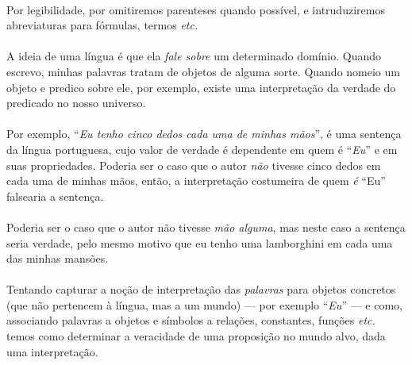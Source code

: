     \paragraph{}
        Por legibilidade, por omitiremos parenteses quando possível, e 
        intruduziremos abreviaturas para fórmulas, termos \emph{etc.}
    \paragraph{}
        A ideia de uma língua é que ela \emph{fale sobre} um determinado
        domínio. Quando escrevo, minhas palavras tratam de objetos de alguma 
        sorte. Quando nomeio um objeto e predico sobre ele, por exemplo, 
        existe uma interpretação da verdade do predicado no nosso universo.
    \paragraph{}
        Por exemplo, ``\emph{Eu tenho cinco dedos cada uma de minhas mãos}'',
        é uma sentença da língua portuguesa, cujo valor de verdade é dependente
        em quem é ``\emph{Eu}'' e em suas propriedades. Poderia ser o caso que
        o autor {\emph{não}} tivesse cinco dedos em cada uma de minhas mãos, então,
        a interpretação costumeira de quem \emph{é} ``Eu'' falsearia a sentença.
    \paragraph{}
        Poderia ser o caso que o autor não tivesse \emph{mão alguma}, mas neste 
        caso a sentença seria verdade, pelo mesmo motivo que eu tenho uma 
        lamborghini em cada uma das minhas mansões.
    \paragraph{}
        Tentando capturar a noção de interpretação das \emph{palavras} para 
        objetos concretos (que não pertencem à língua, mas a um mundo) --- 
        por exemplo ``\emph{Eu}'' --- e como, associando palavras a objetos e 
        símbolos a relações, constantes, funções \emph{etc.} temos como 
        determinar a veracidade de uma proposição no mundo alvo, dada uma 
        interpretação.
    
